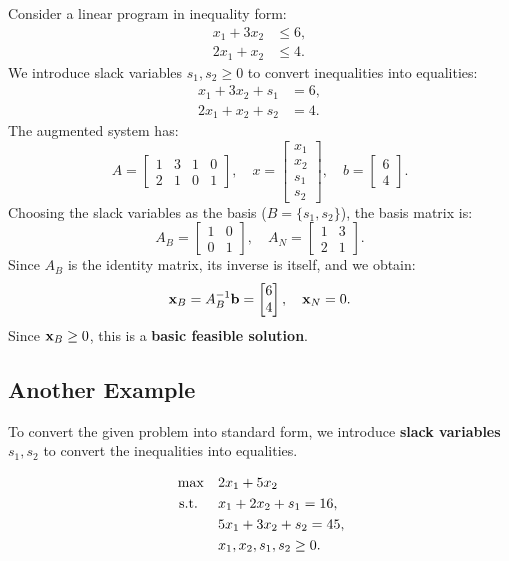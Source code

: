 Consider a linear program in inequality form:
\[
\begin{aligned}
    x_1 + 3x_2 &\leq 6, \\
    2x_1 + x_2 &\leq 4.
\end{aligned}
\]
We introduce slack variables \( s_1, s_2 \geq 0 \) to convert inequalities into equalities:
\[
\begin{aligned}
    x_1 + 3x_2 + s_1 &= 6, \\
    2x_1 + x_2 + s_2 &= 4.
\end{aligned}
\]
The augmented system has:
\[
A =
\begin{bmatrix}
    1 & 3 & 1 & 0 \\
    2 & 1 & 0 & 1
\end{bmatrix}, \quad
x =
\begin{bmatrix}
    x_1 \\ x_2 \\ s_1 \\ s_2
\end{bmatrix}, \quad
b =
\begin{bmatrix}
    6 \\ 4
\end{bmatrix}.
\]
Choosing the slack variables as the basis (\(B= \{s_1, s_2\} \)), the basis matrix is:
\[
A_B =
\begin{bmatrix}
    1 & 0 \\
    0 & 1
\end{bmatrix}, \quad A_N =
\begin{bmatrix}
    1 & 3 \\
    2 & 1
\end{bmatrix}.
\]
Since \( A_B \) is the identity matrix, its inverse is itself, and we obtain:
\[
\mathbf{x}_B = A_B^{-1}\mathbf{b}= 
\begin{bmatrix}
    6 \\ 4
\end{bmatrix}, \quad \mathbf{x}_N = 0.
\]
Since \( \mathbf{x}_B \geq 0 \), this is a \textbf{basic feasible solution}.

\subsection{Another Example}

To convert the given problem into standard form, we introduce \textbf{slack variables} \( s_1, s_2 \) to convert the inequalities into equalities.

\[
\begin{aligned}
    \max \quad & 2 x_1 + 5 x_2 \\
    \mbox{ s.t. } \quad 
    & x_1 + 2x_2 + s_1 = 16, \\
    & 5x_1 + 3x_2 + s_2 = 45, \\
    & x_1, x_2, s_1, s_2 \geq 0.
\end{aligned}
\]

